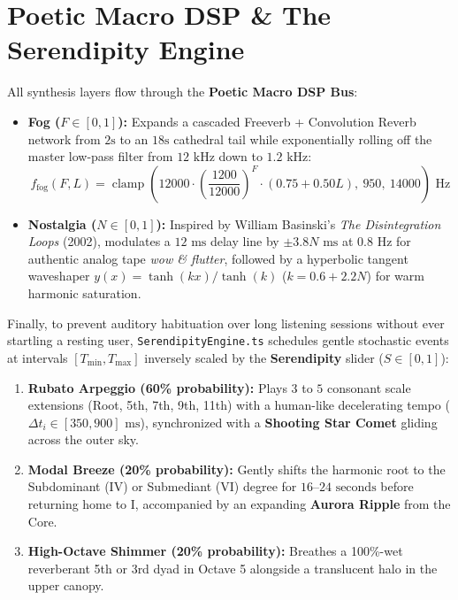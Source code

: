 \documentclass[11pt,oneside,openany]{book}
\begin{document}
\section{Poetic Macro DSP \& The Serendipity Engine}

All synthesis layers flow through the \textbf{Poetic Macro DSP Bus}:
\begin{itemize}
  \item \textbf{Fog ($F \in [0, 1]$):} Expands a cascaded Freeverb + Convolution Reverb network from $2\text{s}$ to an $18\text{s}$ cathedral tail while exponentially rolling off the master low-pass filter from $12\text{ kHz}$ down to $1.2\text{ kHz}$:
  {\small\[
    f_{\text{fog}}(F, L) = \operatorname{clamp}\!\left(12000 \cdot \left(\frac{1200}{12000}\right)^F \cdot (0.75 + 0.50L),\ 950,\ 14000\right)\text{ Hz}
  \]}
  \item \textbf{Nostalgia ($N \in [0, 1]$):} Inspired by William Basinski's \textit{The Disintegration Loops} (2002), modulates a $12\text{ ms}$ delay line by $\pm 3.8N\text{ ms}$ at $0.8\text{ Hz}$ for authentic analog tape \textit{wow \& flutter}, followed by a hyperbolic tangent waveshaper $y(x) = \tanh(kx)/\tanh(k)$ ($k = 0.6 + 2.2N$) for warm harmonic saturation.
\end{itemize}

Finally, to prevent auditory habituation over long listening sessions without ever startling a resting user, \texttt{SerendipityEngine.ts} schedules gentle stochastic events at intervals $[T_{\min}, T_{\max}]$ inversely scaled by the \textbf{Serendipity} slider ($S \in [0, 1]$):
\begin{enumerate}
  \item \textbf{Rubato Arpeggio (60\% probability):} Plays $3$ to $5$ consonant scale extensions (Root, 5th, 7th, 9th, 11th) with a human-like decelerating tempo ($\Delta t_i \in [350, 900]\text{ ms}$), synchronized with a \textbf{Shooting Star Comet} gliding across the outer sky.
  \item \textbf{Modal Breeze (20\% probability):} Gently shifts the harmonic root to the Subdominant ($\text{IV}$) or Submediant ($\text{VI}$) degree for $16\text{--}24\text{ seconds}$ before returning home to $\text{I}$, accompanied by an expanding \textbf{Aurora Ripple} from the Core.
  \item \textbf{High-Octave Shimmer (20\% probability):} Breathes a 100\%-wet reverberant 5th or 3rd dyad in Octave 5 alongside a translucent halo in the upper canopy.
\end{enumerate}
\end{document}
